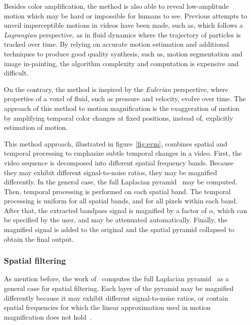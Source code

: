 Besides color amplification, the \evm{} method is also able to reveal
low-amplitude motion which may be hard or impossible for humans to see.
Previous attempts to unveil imperceptible motions in videos have been
made, such as, \cite{Liu2005Motion} which follows a \emph{Lagrangian}
perspective, as in fluid dynamics where the trajectory of particles
is tracked over time. By relying on accurate motion estimation and
additional techniques to produce good quality synthesis, such as,
motion segmentation and image in-painting, the algorithm complexity
and computation is expensive and difficult.

On the contrary, the \evm{} method is inspired by the \emph{Eulerian}
perspective, where properties of a voxel of fluid, such as pressure
and velocity, evolve over time. The approach of this method to motion
magnification is the exaggeration of motion by amplifying temporal
color changes at fixed positions, instead of, explicitly estimation
of motion.

This method approach, illustrated in figure~\ref{fig:evm}, combines
spatial and temporal processing to emphasize subtle temporal changes
in a video. First, the video sequence is decomposed into different
spatial frequency bands. Because they may exhibit different
signal-to-noise ratios, they may be magnified differently.
In the general case, the full Laplacian pyramid~\cite{Burt1983Laplacian}
may be computed. Then, temporal processing is performed on each
spatial band. The temporal processing is uniform for all spatial
bands, and for all pixels within each band. After that, the extracted
bandpass signal is magnified by a factor of $\alpha$, which can be
specified by the user, and may be attenuated automatically. Finally,
the magnified signal is added to the original and the spatial pyramid
collapsed to obtain the final output.

\subsubsection{Spatial filtering} \label{sec:sota:post:evm:spatial}

As mention before, the work of~\cite{Wu2012Eulerian} computes the full
Laplacian pyramid~\cite{Burt1983Laplacian} as a general case for spatial
filtering. Each layer of the pyramid may be magnified differently because
it may exhibit different signal-to-noise ratios, or contain spatial frequencies
for which the linear approximation used in motion magnification does not
hold~\cite[section 3]{Wu2012Eulerian}.

